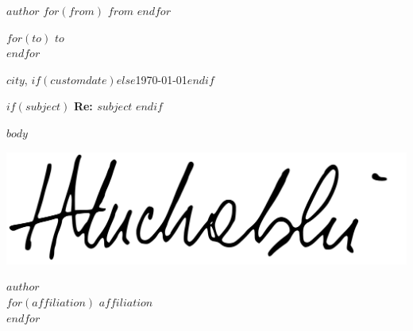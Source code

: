 \documentclass[$fontsize$, letterpaper]{article}
\begin{document}
\small
\textsc{\textbf{$author$}}
$for(from)$
\textbullet{} \textsc{$from$}
$endfor$

\vspace{2em}

\normalsize \rmfamily
$for(to)$
$to$\\
$endfor$



\rmfamily
\begin{flushright}
  $city$, $if(customdate)$$else$\today$endif$
\end{flushright}

$if(subject)$
\textbf{Re: $subject$}
$endif$

\vspace{2em}

$body$
\ClearWallPaper %
\begin{FlushLeft}
  {
    \includegraphics[height=2\baselineskip]{signature.pdf} \par
  }
  {
    \vspace{2.5\baselineskip}
  }
  $author$\\
  $for(affiliation)$
  $affiliation$\\
  $endfor$
\end{FlushLeft}
\end{document}
